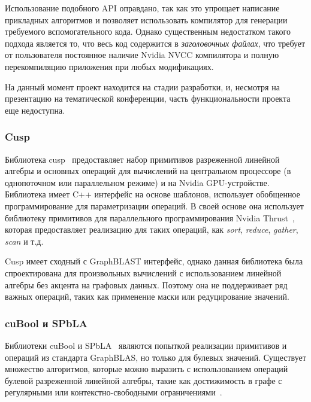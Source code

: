 Использование подобного API оправдано, так как это упрощает написание прикладных алгоритмов и позволяет использовать компилятор для генерации требуемого вспомогательного кода. Однако существенным недостатком такого подхода является то, что весь код содержится в \textit{заголовочных файлах}, что требует от пользователя постоянное наличие Nvidia NVCC компилятора и полную перекомпиляцию приложения при любых модификациях.

На данный момент проект находится на стадии разработки, и, несмотря на презентацию на тематической конференции, часть функциональности проекта еще недоступна.

\subsubsection*{Cusp}

Библиотека cusp~\cite{net:cusplibrary} предоставляет набор примитивов разреженной линейной алгебры и основных операций для вычислений на центральном процессоре (в однопоточном или параллельном режиме) и на Nvidia GPU-устройстве. Библиотека имеет C++ интерфейс на основе шаблонов, использует обобщенное программирование для параметризации операций. В своей основе она использует библиотеку примитивов для параллельного программирования Nvidia Thrust~\cite{net:cuda_thrust}, которая предоставляет реализацию для таких операций, как \textit{sort}, \textit{reduce}, \textit{gather}, \textit{scan} и т.д. 

Cusp имеет сходный с GraphBLAST интерфейс, однако данная библиотека была спроектирована для произвольных вычислений с использованием линейной алгебры без акцента на графовых данных. Поэтому она не поддерживает ряд важных операций, таких как применение маски или редуцирование значений. 

\subsubsection*{cuBool и SPbLA}

Библиотеки cuBool и SPbLA~\cite{article:spbla} являются попыткой реализации примитивов и операций из стандарта GraphBLAS, но только для булевых значений. Существует множество алгоритмов, которые можно выразить с использованием операций булевой разреженной линейной алгебры,
такие как достижимость в графе с регулярными или контекстно-свободными ограничениями~\cite{inproceedings:cfpq_matrix_evaluation, inbook:kronecker_cfpq_adbis, inproceedings:matrix_cfpq, inproceedings:cfqp_matrix_with_single_source}.

